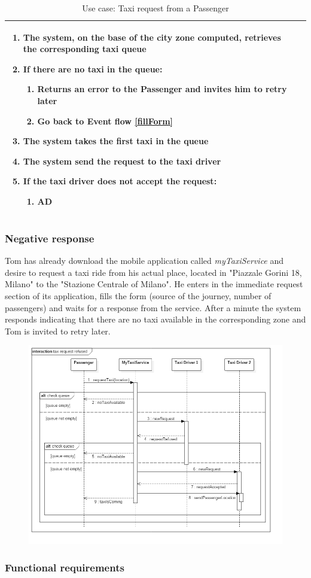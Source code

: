 \begin{table}[H]
\begin{longtable}{| p{} | p{} |}
\begin{enumerate}
				\item The system, on the base of the city zone computed, retrieves the corresponding taxi queue
				\item If there are no taxi in the queue:
				\begin{enumerate}
					\item Returns an error to the Passenger and invites him to retry later
					\item Go back to Event flow \ref{fillForm}
				\end{enumerate}
				\item The system takes the first taxi in the queue
				\item The system send the request to the taxi driver
				\item If the taxi driver does not accept the request:
				\begin{enumerate}
					\item AD
				\end{enumerate}
			\end{enumerate} \\ \hline
\end{longtable}
\caption{Use case: Taxi request from a Passenger}
\end{table}


\subsubsection{Negative response}
Tom has already download the mobile application called \textit{myTaxiService} and desire to request a taxi ride from his actual place, located in "Piazzale Gorini 18, Milano" to the "Stazione Centrale of Milano". He enters in the immediate request section of its application, fills the form (source of the journey, number of passengers) and waits for a response from the service.
After a minute the system responds indicating that there are no taxi available in the corresponding zone and Tom is invited to retry later.
\begin{figure}[H]
\centering
\includegraphics[scale=0.5]{Images/sequence_taxi_request_refused}
\end{figure}

\subsubsection{Functional requirements}
